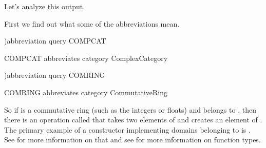 Let's analyze this output.
\begin{xtc}
\begin{xtccomment}
First we find out what some of the abbreviations mean.
\end{xtccomment}
\begin{spadsrc}
)abbreviation query COMPCAT
\end{spadsrc}
\begin{SysCmdOutput}
   COMPCAT abbreviates category ComplexCategory 
\end{SysCmdOutput}
\end{xtc}
\begin{xtc}
\begin{xtccomment}
\end{xtccomment}
\begin{spadsrc}
)abbreviation query COMRING
\end{spadsrc}
\begin{SysCmdOutput}
   COMRING abbreviates category CommutativeRing 
\end{SysCmdOutput}
\end{xtc}

So if  is a commutative ring (such as the integers or
floats) and  belongs to
,
then there is an operation called  that
takes two elements of  and creates an element of
.
The primary example of a constructor implementing domains
belonging to  is .
See  for more information on that and see
 for more information on function types.
